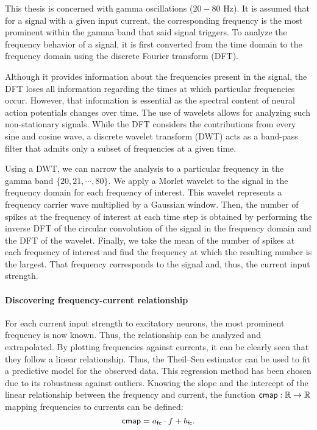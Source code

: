 This thesis is concerned with gamma oscillations ($20 - 80$ Hz). It is assumed that for a signal with a given input current, the corresponding frequency is the most prominent within the gamma band that said signal triggers. To analyze the frequency behavior of a signal, it is first converted from the time domain to the frequency domain using the discrete Fourier transform (DFT). 

Although it provides information about the frequencies present in the signal, the DFT loses all information regarding the times at which particular frequencies occur. However, that information is essential as the spectral content of neural action potentials changes over time. The use of wavelets allows for analyzing such non-stationary signals. While the DFT considers the contributions from every sine and cosine wave, a discrete wavelet transform (DWT) acts as a band-pass filter that admits only a subset of frequencies at a given time.

Using a DWT, we can narrow the analysis to a particular frequency in the gamma band $\{ 20, 21, \cdots, 80 \}$. We apply a Morlet wavelet to the signal in the frequency domain for each frequency of interest. This wavelet represents a frequency carrier wave multiplied by a Gaussian window. Then, the number of spikes at the frequency of interest at each time step is obtained by performing the inverse DFT of the circular convolution of the signal in the frequency domain and the DFT of the wavelet. Finally, we take the mean of the number of spikes at each frequency of interest and find the frequency at which the resulting number is the largest. That frequency corresponds to the signal and, thus, the current input strength.

\paragraph{Discovering frequency-current relationship}

For each current input strength to excitatory neurons, the most prominent frequency is now known. Thus, the relationship can be analyzed and extrapolated. By plotting frequencies against currents, it can be clearly seen that they follow a linear relationship. Thus, the Theil–Sen estimator can be used to fit a predictive model for the observed data. This regression method has been chosen due to its robustness against outliers. Knowing the slope and the intercept of the linear relationship between the frequency and current, the function $\mathsf{cmap}: \mathbb{R} \to \mathbb{R}$ mapping frequencies to currents can be defined:
\begin{equation}
    \mathsf{cmap} = a_\mathsf{fc} \cdot f + b_\mathsf{fc}.
\end{equation}
